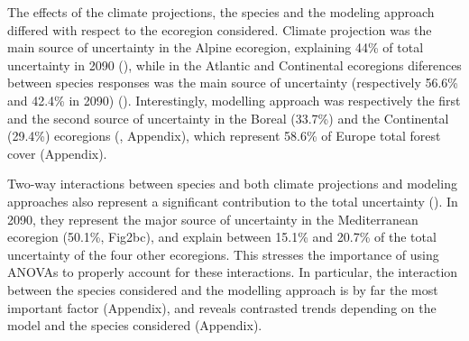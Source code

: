 \documentclass[letterpaper,8pt]{extarticle}  %
\begin{document}
\begin{doublespacing}
\begin{linenumbers}
The effects of the climate projections, the species  and the modeling approach differed with respect to the ecoregion considered. Climate projection was the main source of uncertainty in the Alpine ecoregion, explaining 44\% of total uncertainty in 2090 (), while in the Atlantic and Continental ecoregions diferences between species responses was the main source of uncertainty (respectively 56.6\% and 42.4\% in 2090) (). Interestingly, modelling approach was respectively the first and the second source of uncertainty in the Boreal (33.7\%) and the Continental (29.4\%) ecoregions (, Appendix), which represent 58.6\% of Europe total forest cover (Appendix).
% 

Two-way interactions between species and both climate projections and modeling approaches also represent a significant contribution to the total uncertainty (). In 2090, they represent the major source of uncertainty in the Mediterranean ecoregion  (50.1\%, Fig2bc), and explain between 15.1\% and 20.7\% of the total uncertainty of the four other ecoregions. This stresses the importance of using ANOVAs to properly account for these interactions. In particular, the interaction between the species considered and the modelling approach is by far the most important factor (Appendix), and reveals contrasted trends depending on the model and the species considered (Appendix). 


\end{linenumbers}
\end{doublespacing}
\end{document}
